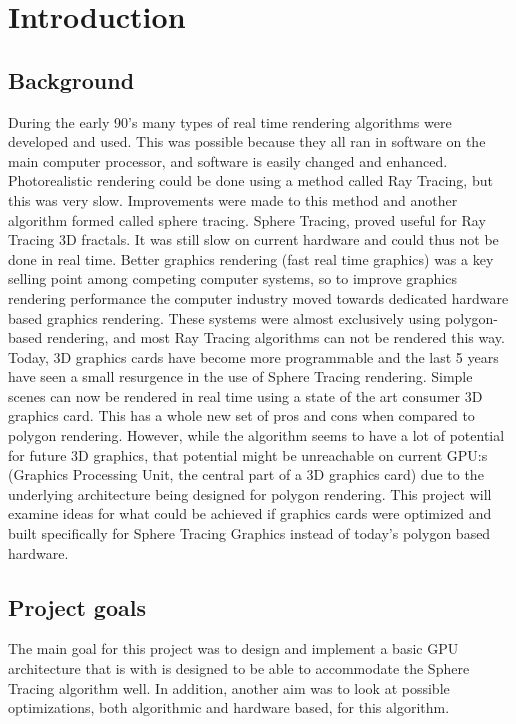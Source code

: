 \chapter{Introduction} 
	
	\section{Background}
		During the early 90’s many types of real time rendering algorithms were 
		developed and used. This was possible because they all ran in software 
		on the main computer processor, and software is easily changed and 
		enhanced. Photorealistic rendering could be done using a method called 
		Ray Tracing, but this was very slow. Improvements were made to this method
		and another algorithm formed called sphere tracing.
		 Sphere Tracing,  proved useful for Ray Tracing 
		3D fractals. It was still slow on current hardware and could 
		thus not be done in real time. Better graphics rendering
		(fast real time graphics) was a key selling point among competing 
		computer systems, so to improve graphics rendering performance the 
		computer industry moved towards dedicated hardware based graphics 
		rendering. These systems were almost exclusively using polygon-based 
		rendering, and most Ray Tracing algorithms can not be rendered this 
		way. Today, 3D graphics cards have become more programmable and the 
		last 5 years have seen a small resurgence in the use of Sphere Tracing
		rendering. Simple scenes can now be rendered in real time using a state 
		of the art consumer 3D graphics card. This has a whole new set of pros 
		and cons when compared to polygon rendering. However, while 
		the algorithm seems to have a lot of potential for future 3D graphics, 
		that potential might be unreachable on current GPU:s 
		(Graphics Processing Unit, the central part of a 3D graphics card) due 
		to the underlying architecture being designed for polygon rendering. 
		This project will examine ideas for what could be achieved if graphics 
		cards were optimized and built specifically for Sphere Tracing Graphics
		instead of today’s polygon based hardware.
		 
	
	\section{Project goals}

		The main goal for this project was to design and implement a basic GPU 
		architecture that is with is designed to be able to accommodate the Sphere 
		Tracing algorithm well. In addition, another aim was to look at possible 
		optimizations, both algorithmic	and hardware based, for this algorithm.
		
